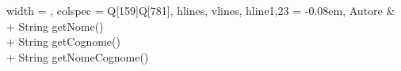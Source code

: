 \begin{longtblr}[
    label = none,
    entry = none,
  ]{
    width = \linewidth,
    colspec = {Q[159]Q[781]},
    hlines,
    vlines,
    hline{1,23} = {-}{0.08em},
  }
  Autore                 & {+ String getNome()\\+ String getCognome()\\+ String getNomeCognome()}                                                                                                                                                                                                                                                                                                                                                                                                                                                                                                                                                                                                                                                                                                                                                                                                                                                                                                                                                                                                                                                                                                                                                                                                                                                                                                                                                                                                                                                                                                                                                                                                                                                                                                                                                                                                                          \\

\end{longtblr}
